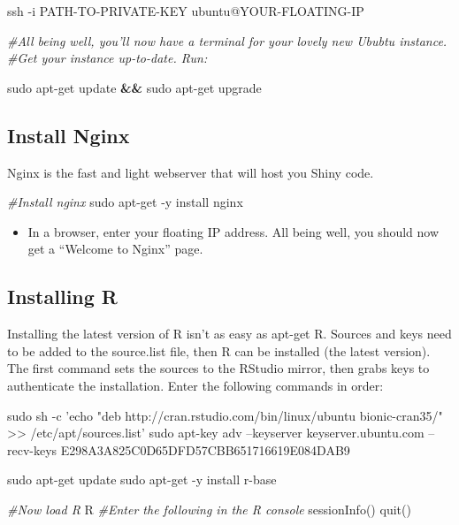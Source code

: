 \documentclass[
]{book}
\newenvironment{Shaded}{\begin{snugshade}}{\end{snugshade}}
\newcommand{\CommentTok}[1]{\textcolor[rgb]{0.56,0.35,0.01}{\textit{#1}}}
\newcommand{\ExtensionTok}[1]{#1}
\newcommand{\FunctionTok}[1]{\textcolor[rgb]{0.00,0.00,0.00}{#1}}
\newcommand{\KeywordTok}[1]{\textcolor[rgb]{0.13,0.29,0.53}{\textbf{#1}}}
\newcommand{\NormalTok}[1]{#1}
\newcommand{\StringTok}[1]{\textcolor[rgb]{0.31,0.60,0.02}{#1}}
\providecommand{\tightlist}{%
  \setlength{\itemsep}{0pt}\setlength{\parskip}{0pt}}
\begin{document}
\begin{Shaded}
\begin{Highlighting}[]
\FunctionTok{ssh}\NormalTok{ -i PATH-TO-PRIVATE-KEY ubuntu@YOUR-FLOATING-IP}

\CommentTok{#All being well, you’ll now have a terminal for your lovely new Ububtu instance.}
\CommentTok{#Get your instance up-to-date. Run:}

\FunctionTok{sudo}\NormalTok{ apt-get update }\KeywordTok{&&} \FunctionTok{sudo}\NormalTok{ apt-get upgrade}
\end{Highlighting}
\end{Shaded}

\hypertarget{install-nginx}{%
\subsection{Install Nginx}\label{install-nginx}}

Nginx is the fast and light webserver that will host you Shiny code.

\begin{Shaded}
\begin{Highlighting}[]

\CommentTok{#Install nginx}
\FunctionTok{sudo}\NormalTok{ apt-get -y install nginx}
\end{Highlighting}
\end{Shaded}

\begin{itemize}
\tightlist
\item
  In a browser, enter your floating IP address. All being well, you should now get a ``Welcome to Nginx'' page.
\end{itemize}

\hypertarget{installing-r}{%
\subsection{Installing R}\label{installing-r}}

Installing the latest version of R isn't as easy as apt-get R. Sources and keys need to be added to the source.list file, then R can be installed (the latest version). The first command sets the sources to the RStudio mirror, then grabs keys to authenticate the installation. Enter the following commands in order:

\begin{Shaded}
\begin{Highlighting}[]

\FunctionTok{sudo}\NormalTok{ sh -c }\StringTok{'echo "deb http://cran.rstudio.com/bin/linux/ubuntu bionic-cran35/" >> /etc/apt/sources.list'}
\FunctionTok{sudo}\NormalTok{ apt-key adv --keyserver keyserver.ubuntu.com --recv-keys E298A3A825C0D65DFD57CBB651716619E084DAB9}

\FunctionTok{sudo}\NormalTok{ apt-get update}
\FunctionTok{sudo}\NormalTok{ apt-get -y install r-base}


\CommentTok{#Now load R}
\ExtensionTok{R}
\CommentTok{#Enter the following in the R console}
\FunctionTok{sessionInfo()}
\FunctionTok{quit()}
\end{Highlighting}
\end{Shaded}
\end{document}
